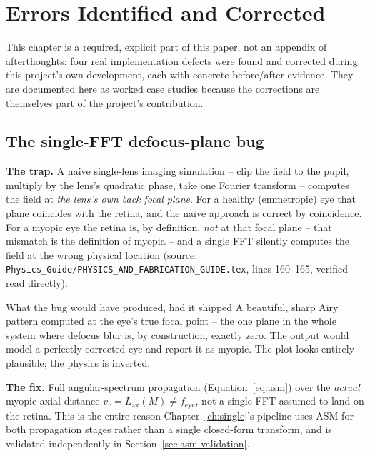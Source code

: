 \chapter{Errors Identified and Corrected}
\label{ch:errors}

This chapter is a required, explicit part of this paper, not an appendix of
afterthoughts: four real implementation defects were found and corrected during this
project's own development, each with concrete before/after evidence. They are
documented here as worked case studies because the corrections are themselves part of
the project's contribution.

\section{The single-FFT defocus-plane bug}
\label{sec:bug-fft}
\textbf{The trap.} A naive single-lens imaging simulation -- clip the field to the
pupil, multiply by the lens's quadratic phase, take one Fourier transform -- computes
the field at \emph{the lens's own back focal plane}. For a healthy (emmetropic) eye
that plane coincides with the retina, and the naive approach is correct by coincidence.
For a myopic eye the retina is, by definition, \emph{not} at that focal plane -- that
mismatch is the definition of myopia -- and a single FFT silently computes the field at
the wrong physical location (source:
\texttt{Physics\_Guide/PHYSICS\_AND\_FABRICATION\_GUIDE.tex}, lines 160--165, verified
read directly).

\begin{warnbox}{What the bug would have produced, had it shipped}
A beautiful, sharp Airy pattern computed at the eye's true focal point -- the one plane
in the whole system where defocus blur is, by construction, exactly zero. The output
would model a perfectly-corrected eye and report it as myopic. The plot looks entirely
plausible; the physics is inverted.
\end{warnbox}

\textbf{The fix.} Full angular-spectrum propagation (Equation~\ref{eq:asm}) over the
\emph{actual} myopic axial distance $v_r=L_{\mathrm{ax}}(M)\ne f_{\mathrm{eye}}$, not a
single FFT assumed to land on the retina. This is the entire reason
Chapter~\ref{ch:single}'s pipeline uses ASM for both propagation stages rather than a
single closed-form transform, and is validated independently in
Section~\ref{sec:asm-validation}.

